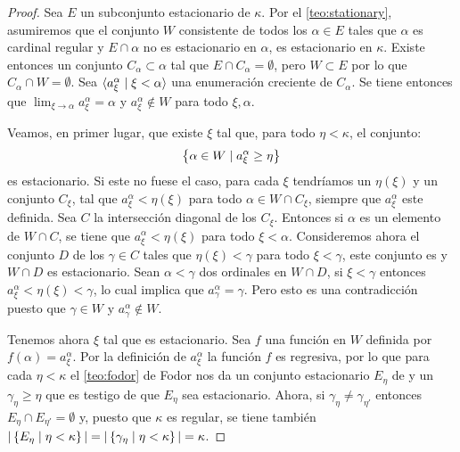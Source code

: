 \newcommand{\seqa}{a_\xi^\alpha}
\begin{proof}
    Sea $E$ un subconjunto estacionario de $\kappa$.
    Por el \cref{teo:stationary}, asumiremos que el conjunto $W$
    consistente de todos los $\alpha\in E$ tales que $\alpha$ es cardinal
    regular y $E\cap\alpha$ no es estacionario en $\alpha$, es estacionario en $\kappa$.
    Existe entonces un conjunto \cna{} $C_\alpha\subset\alpha$ tal que $E\cap C_\alpha = \emptyset$,
    pero $W\subset E$ por lo que $C_\alpha\cap W=\emptyset$.
    Sea $\seq{\seqa\mid\xi<\alpha}$ una enumeración creciente de $C_\alpha$.
    Se tiene entonces que $\lim_{\xi\to\alpha}\seqa = \alpha$ y $\seqa\notin W$ para todo $\xi, \alpha$.

    Veamos, en primer lugar, que existe $\xi$ tal que, para todo $\eta<\kappa$, el conjunto:
    \begin{equation}\label{eqn:solovay-stationary}
        \set{\alpha\in W\mid \seqa\geq\eta}
    \end{equation}
    es estacionario. Si este no fuese el caso, para cada $\xi$ tendríamos un $\eta(\xi)$
    y un conjunto \cna{} $C_\xi$, tal que $\seqa < \eta(\xi)$ para todo $\alpha\in W\cap C_\xi$, siempre que $\seqa$
    este definida. Sea $C$ la intersección diagonal de los $C_\xi$. Entonces si $\alpha$ es un elemento de
    $W\cap C$, se tiene que $\seqa < \eta(\xi)$ para todo $\xi<\alpha$. Consideremos ahora el conjunto $D$ de
    los $\gamma\in C$ tales que $\eta(\xi)<\gamma$ para todo $\xi<\gamma$, este conjunto es \cna{}
    y $W\cap D$ es estacionario. Sean $\alpha<\gamma$ dos ordinales en $W\cap D$,
    si $\xi<\gamma$ entonces $\seqa<\eta(\xi)<\gamma$, lo cual implica que $a_\gamma^\alpha = \gamma$.
    Pero esto es una contradicción puesto que $\gamma\in W$ y $a_\gamma^\alpha\notin W$.

    Tenemos ahora $\xi$ tal que  es estacionario.
    Sea $f$ una función en $W$ definida por $f(\alpha)=\seqa$. Por la definición de $\seqa$
    la función $f$ es regresiva, por lo que para cada $\eta<\kappa$ el \cref{teo:fodor} de Fodor
    nos da un conjunto estacionario $E_\eta$ de  y un $\gamma_\eta\geq\eta$
    que es testigo de que $E_\eta$ sea estacionario.
    Ahora, si $\gamma_\eta\neq\gamma_{\eta'}$ entonces $E_\eta\cap E_{\eta'} = \emptyset$ y, puesto que $\kappa$ es regular,
    se tiene también $|\left\{ E_\eta\mid\eta<\kappa \right\}| = |\left\{ \gamma_\eta\mid\eta<\kappa \right\}| = \kappa$.
\end{proof}

